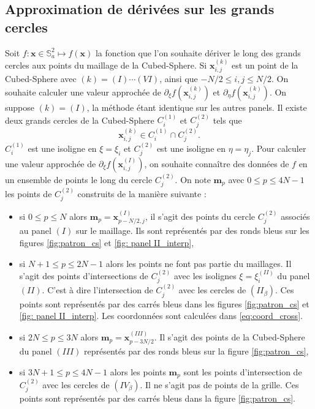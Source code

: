 \subsection{Approximation de dérivées sur les grands cercles}

Soit $f : \mathbf{x}\in \mathbb{S}_a^2 \mapsto f(\mathbf{x})$ la fonction que l'on souhaite dériver le long des grands cercles aux points du maillage de la Cubed-Sphere.
Si $\mathbf{x}_{i,j}^{(k)}$ est un point de la Cubed-Sphere avec $(k) = (I) \cdots (VI)$, ainsi que $-N/2 \leq i,j \leq N/2$. On souhaite calculer une valeur approchée de 
$
\partial_{\xi} f (\mathbf{x}_{i,j}^{(k)})$ et $\partial_{\eta} f (\mathbf{x}_{i,j}^{(k)})$.
On suppose $(k) = (I)$, la méthode étant identique sur les autres panels. Il existe deux grands cercles de la Cubed-Sphere $C_i^{(1)}$ et $C_j^{(2)}$ tels que 
\begin{equation}
\mathbf{x}_{i,j}^{(k)} \in C_i^{(1)} \cap C^{(2)}_j.
\end{equation}
$C^{(1)}_i$ est une isoligne en $\xi = \xi_i$ et $C^{(2)}_j$ est une isoligne en $\eta = \eta_j$.
Pour calculer une valeur approchée de $\partial_{\xi} f (\mathbf{x}_{i,j}^{(I)})$, on souhaite connaître des données de $f$ en un ensemble de points le long du cercle $C^{(2)}_j$. On note $\mathbf{m}_p$ avec $0 \leq p \leq 4N-1$ les points de $C^{(2)}_j$ construits de la manière suivante :
\begin{itemize}
\item si $0 \leq p \leq N$ alors $\mathbf{m}_p = \mathbf{x}^{(I)}_{p-N/2,j}$, il s'agit des points du cercle $C^{(2)}_j$ associés au panel $(I)$ sur le maillage. Ils sont représentés par des ronds bleus sur les figures \ref{fig:patron_cs} et \ref{fig: panel II_interp},
\item si $N+1 \leq p \leq 2N-1$ alors les points ne font pas partie du maillages. Il s'agit des points d'intersections de $C^{(2)}_j$ avec les isolignes $\xi = \xi_i^{(II)}$ du panel $(II)$. C'est à dire l'intersection de $C^{(2)}_j$ avec les cercles de $(II_{\beta})$. Ces points sont représentés par des carrés bleus dans les figures \ref{fig:patron_cs} et \ref{fig: panel II_interp}. Les coordonnées sont calculées dans \eqref{eq:coord_cross}.
\item si $2N \leq p \leq 3N$ alors $\mathbf{m}_p = \mathbf{x}^{(III)}_{p-3N/2}$. Il s'agit des points de la Cubed-Sphere du panel $(III)$ représentés par des ronds bleus sur la figure \ref{fig:patron_cs},
\item si $3N+1 \leq p \leq 4N-1$ alors les points $\mathbf{m}_p$ sont les points d'intersection de $C^{(2)}_j$ avec les cercles de $(IV_{\beta})$. Il ne s'agit pas de points de la grille. Ces points sont représentés par des carrés bleus dans la figure \ref{fig:patron_cs}.
\end{itemize}


